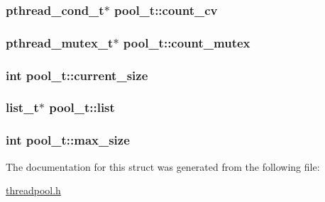 \subsubsection[{count\+\_\+cv}]{\setlength{\rightskip}{0pt plus 5cm}pthread\+\_\+cond\+\_\+t$\ast$ pool\+\_\+t\+::count\+\_\+cv}\label{structpool_aa0f704f15aebe84d4264ef85c8074fc9}
\hypertarget{structpool_ae5d29237dc5f83accc03d65f825b127f}{}
\subsubsection[{count\+\_\+mutex}]{\setlength{\rightskip}{0pt plus 5cm}pthread\+\_\+mutex\+\_\+t$\ast$ pool\+\_\+t\+::count\+\_\+mutex}\label{structpool_ae5d29237dc5f83accc03d65f825b127f}
\hypertarget{structpool_a9f7a2e94e1205655dfc8c6bf60862501}{}
\subsubsection[{current\+\_\+size}]{\setlength{\rightskip}{0pt plus 5cm}int pool\+\_\+t\+::current\+\_\+size}\label{structpool_a9f7a2e94e1205655dfc8c6bf60862501}
\hypertarget{structpool_a95cbd0e4b46a4ae78a62db9f7f4ef3a9}{}
\subsubsection[{list}]{\setlength{\rightskip}{0pt plus 5cm}list\+\_\+t$\ast$ pool\+\_\+t\+::list}\label{structpool_a95cbd0e4b46a4ae78a62db9f7f4ef3a9}
\hypertarget{structpool_aefc86e749ecf9ab0aea5459173180e3a}{}
\subsubsection[{max\+\_\+size}]{\setlength{\rightskip}{0pt plus 5cm}int pool\+\_\+t\+::max\+\_\+size}\label{structpool_aefc86e749ecf9ab0aea5459173180e3a}


The documentation for this struct was generated from the following file\+:\begin{DoxyCompactItemize}
\item 
\hyperlink{threadpool_8h}{threadpool.\+h}\end{DoxyCompactItemize}
